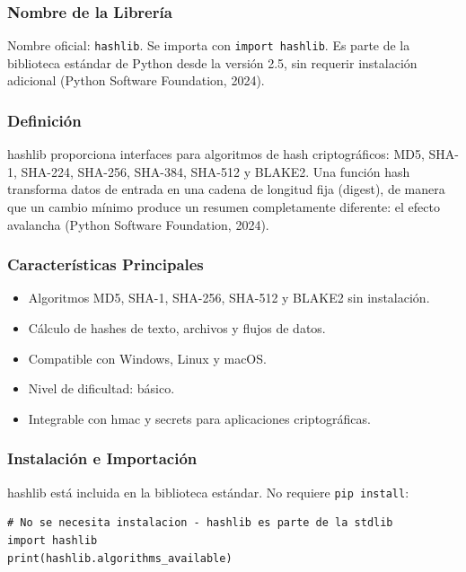 \documentclass[12pt,a4paper]{article}
\begin{document}
\subsubsection{Nombre de la Librería}

Nombre oficial: \texttt{hashlib}. Se importa con \texttt{import hashlib}.
Es parte de la biblioteca estándar de Python desde la versión 2.5, sin
requerir instalación adicional (Python Software Foundation, 2024).

\subsubsection{Definición}

hashlib proporciona interfaces para algoritmos de hash criptográficos:
MD5, SHA-1, SHA-224, SHA-256, SHA-384, SHA-512 y BLAKE2. Una función
hash transforma datos de entrada en una cadena de longitud fija
(digest), de manera que un cambio mínimo produce un resumen
completamente diferente: el efecto avalancha (Python Software Foundation,
2024).

\subsubsection{Características Principales}

\begin{itemize}
\item Algoritmos MD5, SHA-1, SHA-256, SHA-512 y BLAKE2 sin instalación.
\item Cálculo de hashes de texto, archivos y flujos de datos.
\item Compatible con Windows, Linux y macOS.
\item Nivel de dificultad: básico.
\item Integrable con hmac y secrets para aplicaciones criptográficas.
\end{itemize}

\subsubsection{Instalación e Importación}

hashlib está incluida en la biblioteca estándar. No requiere \texttt{pip install}:

\begin{lstlisting}[caption={Carga de hashlib sin instalación},
                   label=lst:hashlib_import]
# No se necesita instalacion - hashlib es parte de la stdlib
import hashlib
print(hashlib.algorithms_available)
\end{lstlisting}
\end{document}
